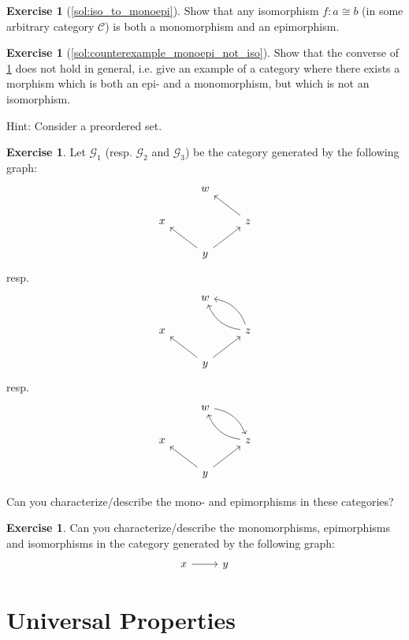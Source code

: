 \documentclass[a4paper,10pt]{scrartcl}
\theoremstyle{plain}
\theoremstyle{definition}
\newtheorem{exer}[thm]{Exercise}
\newcommand{\Cat}[1]{\mathcal{#1}}
\newcommand{\CC}{\Cat{C}}
\begin{document}
\begin{exer}[\cref{sol:iso_to_monoepi}]\label{exer:iso_to_monoepi}
  Show that any isomorphism $f : a\cong b$ (in some arbitrary category $\CC$) is both a monomorphism and an epimorphism.
\end{exer}

\begin{exer}[\cref{sol:counterexample_monoepi_not_iso}]\label{exer:counterexample_monoepi_not_iso}
  Show that the converse of \cref{exer:iso_to_monoepi} does not hold in general, i.e. give an example of a category where there exists a morphism which is both an epi- and a monomorphism, but which is not an isomorphism.

Hint: Consider a preordered set.
\end{exer}

\begin{exer} Let $\mathcal{G}_1$ (resp. $\mathcal{G}_2$ and $\mathcal{G}_3$) be the category generated by the following graph:
\[
\begin{tikzcd}
& w & \\
x & & z \arrow[lu] \\
& y \arrow[lu] \arrow[ru] &
\end{tikzcd}
\]
resp.
\[
\begin{tikzcd}
& w & \\
x & & z \arrow[lu, bend left] \arrow[lu,bend right] \\
& y \arrow[lu] \arrow[ru] &
\end{tikzcd}
\]
resp.
\[
\begin{tikzcd}
& w \arrow[rd,bend left] & \\
x & & z \arrow[lu, bend left] \\
& y \arrow[lu] \arrow[ru] &
\end{tikzcd}
\]

Can you characterize/describe the mono- and epimorphisms in these categories?
\end{exer}

\begin{exer} Can you characterize/describe the monomorphisms, epimorphisms and isomorphisms in the category generated by the following graph:
\[
\begin{tikzcd}
x \arrow[r] & y
\end{tikzcd}
\]
\end{exer}

\section{Universal Properties}\label{sec:universal}
\end{document}
